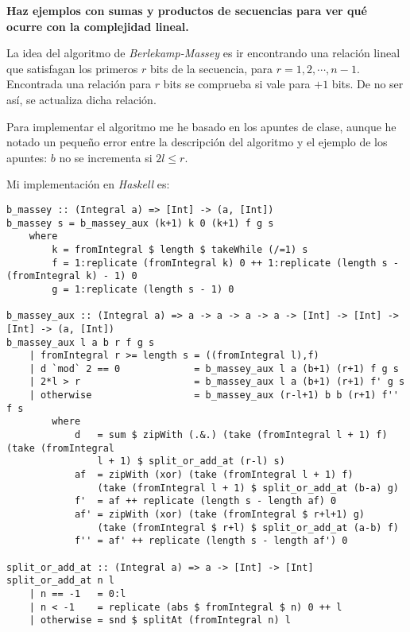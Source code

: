 \documentclass[10pt,spanish]{article}
\begin{document}
\textbf{Haz ejemplos con sumas y productos de secuencias para ver qué ocurre con la complejidad lineal.}

La idea del algoritmo de \textit{\textcolor{azul}{Berlekamp-Massey}} es ir encontrando una relación lineal que satisfagan los primeros $r$ bits de la secuencia, para $r = 1,2,\cdots,n-1$. Encontrada una relación para $r$ bits se comprueba si vale para $+1$ bits. De no ser así, se actualiza dicha relación.

Para implementar el algoritmo me he basado en los apuntes de clase, aunque he notado un pequeño error entre la descripción del algoritmo y el ejemplo de los apuntes: $b$ no se incrementa si $2l \leq r$. 

Mi implementación en \textit{\textcolor{azul}{Haskell}} es:

\begin{verbatim}
b_massey :: (Integral a) => [Int] -> (a, [Int])
b_massey s = b_massey_aux (k+1) k 0 (k+1) f g s 
    where
        k = fromIntegral $ length $ takeWhile (/=1) s
        f = 1:replicate (fromIntegral k) 0 ++ 1:replicate (length s - (fromIntegral k) - 1) 0
        g = 1:replicate (length s - 1) 0

b_massey_aux :: (Integral a) => a -> a -> a -> a -> [Int] -> [Int] -> [Int] -> (a, [Int])
b_massey_aux l a b r f g s
    | fromIntegral r >= length s = ((fromIntegral l),f)
    | d `mod` 2 == 0             = b_massey_aux l a (b+1) (r+1) f g s
    | 2*l > r                    = b_massey_aux l a (b+1) (r+1) f' g s
    | otherwise                  = b_massey_aux (r-l+1) b b (r+1) f'' f s
        where
            d   = sum $ zipWith (.&.) (take (fromIntegral l + 1) f) (take (fromIntegral 
                l + 1) $ split_or_add_at (r-l) s)
            af  = zipWith (xor) (take (fromIntegral l + 1) f) 
                (take (fromIntegral l + 1) $ split_or_add_at (b-a) g)
            f'  = af ++ replicate (length s - length af) 0
            af' = zipWith (xor) (take (fromIntegral $ r+l+1) g) 
                (take (fromIntegral $ r+l) $ split_or_add_at (a-b) f)
            f'' = af' ++ replicate (length s - length af') 0

split_or_add_at :: (Integral a) => a -> [Int] -> [Int]
split_or_add_at n l
    | n == -1   = 0:l
    | n < -1    = replicate (abs $ fromIntegral $ n) 0 ++ l
    | otherwise = snd $ splitAt (fromIntegral n) l
\end{verbatim}
\end{document}
